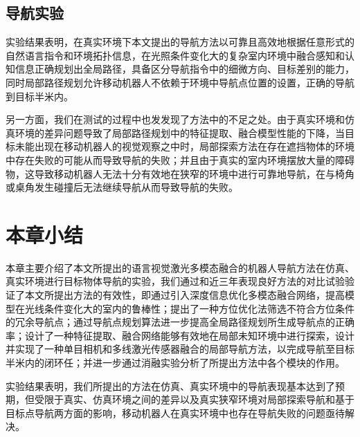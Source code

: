 \subsection{导航实验}












实验结果表明，在真实环境下本文提出的导航方法以可靠且高效地根据任意形式的自然语言指令和环境拓扑信息，在光照条件变化大的复杂室内环境中融合感知和认知信息正确规划出全局路径，具备区分导航指令中的细微方向、目标差别的能力，同时局部路径规划允许移动机器人不依赖于环境中导航点位置的设置，正确的导航到目标半米内。

另一方面，我们在测试的过程中也发发现了方法中的不足之处。由于真实环境和仿真环境的差异问题导致了局部路径规划中的特征提取、融合模型性能的下降，当目标未能出现在移动机器人的视觉观察之中时，局部探索方法在存在遮挡物体的环境中存在失败的可能从而导致导航的失败；并且由于真实的室内环境摆放大量的障碍物，这导致移动机器人无法十分有效地在狭窄的环境中进行可靠地导航，在与椅角或桌角发生碰撞后无法继续导航从而导致导航的失败。


\section{本章小结}

本章主要介绍了本文所提出的语言视觉激光多模态融合的机器人导航方法在仿真、真实环境进行目标物体导航的实验，我们通过和近三年表现良好方法的对比试验验证了本文所提出方法的有效性，即通过引入深度信息优化多模态融合网络，提高模型在光线条件变化大的室内的鲁棒性；提出了一种方位优化法筛选不符合方位条件的冗余导航点；通过导航点规划算法进一步提高全局路径规划所生成导航点的正确率；设计了一种特征提取、融合网络能够有效地在局部未知环境中进行探索，设计并实现了一种单目相机和多线激光传感器融合的局部导航方法，以完成导航至目标半米内的闭环任；并进一步通过消融实验分析了所提出方法中各个模块的作用。

实验结果表明，我们所提出的方法在仿真、真实环境中的导航表现基本达到了预期，但受限于真实、仿真环境之间的差异以及真实狭窄环境对局部探索导航和基于目标点导航两方面的影响，移动机器人在真实环境中也存在导航失败的问题亟待解决。